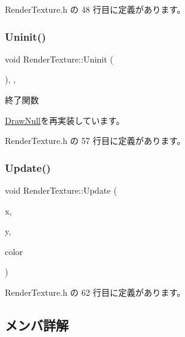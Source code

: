  Render\+Texture.\+h の 48 行目に定義があります。

\mbox{\label{class_render_texture_a0e55cd9b412d87dfe1f4b90f29f357c8}} 
\subsubsection{\texorpdfstring{Uninit()}{Uninit()}}
{\footnotesize\ttfamily void Render\+Texture\+::\+Uninit (\begin{DoxyParamCaption}{ }\end{DoxyParamCaption})\hspace{0.3cm}{\ttfamily [inline]}, {\ttfamily [override]}, {\ttfamily [virtual]}}



終了関数 



\mbox{\hyperlink{class_draw_null_a6e81d63efab7333e8d0e8af99362a4d9}{Draw\+Null}}を再実装しています。



 Render\+Texture.\+h の 57 行目に定義があります。

\mbox{\label{class_render_texture_ac27f8cfac7903dd502de61e22abfc457}} 
\subsubsection{\texorpdfstring{Update()}{Update()}}
{\footnotesize\ttfamily void Render\+Texture\+::\+Update (\begin{DoxyParamCaption}\item[{float}]{x,  }\item[{float}]{y,  }\item[{\mbox{\hyperlink{_vector3_d_8h_a680c30c4a07d86fe763c7e01169cd6cc}{X\+Color4}}}]{color }\end{DoxyParamCaption})\hspace{0.3cm}{\ttfamily [inline]}}



 Render\+Texture.\+h の 62 行目に定義があります。



\subsection{メンバ詳解}
\mbox{\label{class_render_texture_ad354ed8b9968b5741feb43775cc821b9}} 
